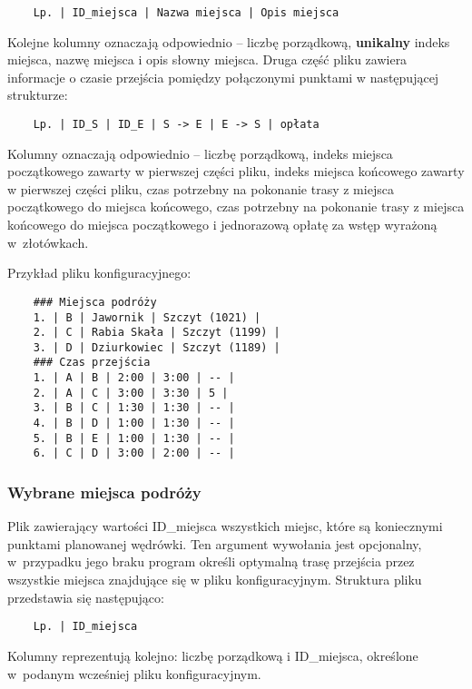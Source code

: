 \documentclass{article}
\begin{document}
\vspace{5pt}
\begin{verbatim}
    Lp. | ID_miejsca | Nazwa miejsca | Opis miejsca
\end{verbatim}
\vspace{5pt}

Kolejne kolumny oznaczają odpowiednio -- liczbę porządkową, \textbf{unikalny} indeks miejsca, nazwę miejsca i opis słowny miejsca. Druga część pliku zawiera informacje o czasie przejścia pomiędzy połączonymi punktami w następującej strukturze:

\vspace{5pt}
\begin{verbatim}
    Lp. | ID_S | ID_E | S -> E | E -> S | opłata 
\end{verbatim}
\noindent Kolumny oznaczają odpowiednio -- liczbę porządkową, indeks miejsca początkowego zawarty w pierwszej części pliku, indeks miejsca końcowego zawarty w pierwszej części pliku, czas potrzebny na pokonanie trasy z miejsca początkowego do miejsca końcowego, czas potrzebny na pokonanie trasy z miejsca końcowego do miejsca początkowego i jednorazową opłatę za wstęp wyrażoną w~złotówkach.

\vspace{10pt}
Przykład pliku konfiguracyjnego:
\vspace{-8pt}
\begin{verbatim}
    ### Miejsca podróży
    1. | B | Jawornik | Szczyt (1021) |
    2. | C | Rabia Skała | Szczyt (1199) |
    3. | D | Dziurkowiec | Szczyt (1189) |
    ### Czas przejścia
    1. | A | B | 2:00 | 3:00 | -- |
    2. | A | C | 3:00 | 3:30 | 5 |
    3. | B | C | 1:30 | 1:30 | -- |
    4. | B | D | 1:00 | 1:30 | -- |
    5. | B | E | 1:00 | 1:30 | -- |
    6. | C | D | 3:00 | 2:00 | -- |
\end{verbatim}

\subsubsection{Wybrane miejsca podróży}
Plik zawierający wartości ID\_miejsca wszystkich miejsc, które są koniecznymi punktami planowanej wędrówki. Ten argument wywołania jest opcjonalny, w~przypadku jego braku program określi optymalną trasę przejścia przez wszystkie miejsca znajdujące się w pliku konfiguracyjnym. Struktura pliku przedstawia się następująco: 
\begin{verbatim}
    Lp. | ID_miejsca
\end{verbatim}
\noindent Kolumny reprezentują kolejno: liczbę porządkową i ID\_miejsca, określone w~podanym wcześniej pliku konfiguracyjnym. 
\end{document}
